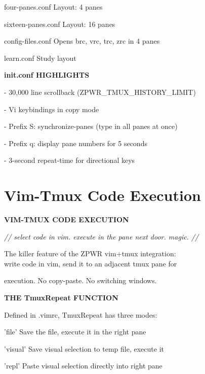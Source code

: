 \documentclass[11pt,a4paper,twoside]{book}
\begin{document}
four-panes.conf         Layout: 4 panes

sixteen-panes.conf      Layout: 16 panes

config-files.conf       Opens brc, vrc, trc, zrc in 4 panes

learn.conf              Study layout


\vspace{12pt}
{\bfseries\color{neonyellow} init.conf HIGHLIGHTS}\vspace{4pt}

- 30,000 line scrollback (ZPWR\_TMUX\_HISTORY\_LIMIT)

- Vi keybindings in copy mode

- Prefix S: synchronize-panes (type in all panes at once)

- Prefix q: display pane numbers for 5 seconds

- 3-second repeat-time for directional keys


\vspace{16pt}

\section{Vim-Tmux Code Execution}


\vspace{10pt}
{\large\bfseries\color{neoncyan} VIM-TMUX CODE EXECUTION}\vspace{6pt}

{\small\itshape\color{dimtext} // select code in vim. execute in the pane next door. magic. //}

\begin{codebox}
The killer feature of the ZPWR vim+tmux integration:\\
write code in vim, send it to an adjacent tmux pane for\\
\end{codebox}

execution. No copy-paste. No switching windows.


\vspace{12pt}
{\bfseries\color{neonyellow} THE TmuxRepeat FUNCTION}\vspace{4pt}

Defined in .vimrc, TmuxRepeat has three modes:

'file'    Save the file, execute it in the right pane

'visual'  Save visual selection to temp file, execute it

'repl'    Paste visual selection directly into right pane
\end{document}
